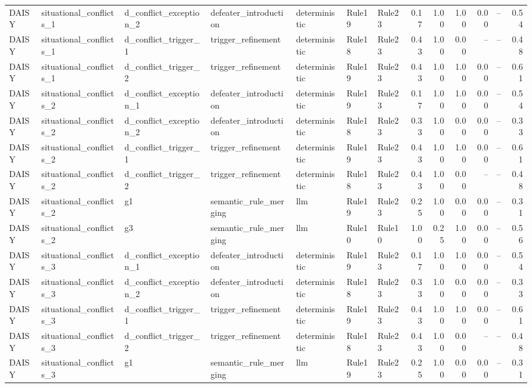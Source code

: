\begin{table}[t]
{\begin{tabular}{lllllllrrrrrr}
DAISY & situational\_conflicts\_1 & d\_conflict\_exception\_2 & defeater\_introduction & deterministic & Rule19 & Rule23 & 0.17 & 1.00 & 1.00 & 0.00 & -- & 0.54 \\
DAISY & situational\_conflicts\_1 & d\_conflict\_trigger\_1 & trigger\_refinement & deterministic & Rule18 & Rule23 & 0.43 & 1.00 & 0.00 & -- & -- & 0.48 \\
DAISY & situational\_conflicts\_1 & d\_conflict\_trigger\_2 & trigger\_refinement & deterministic & Rule19 & Rule23 & 0.43 & 1.00 & 1.00 & 0.00 & -- & 0.61 \\
DAISY & situational\_conflicts\_2 & d\_conflict\_exception\_1 & defeater\_introduction & deterministic & Rule19 & Rule23 & 0.17 & 1.00 & 1.00 & 0.00 & -- & 0.54 \\
DAISY & situational\_conflicts\_2 & d\_conflict\_exception\_2 & defeater\_introduction & deterministic & Rule18 & Rule23 & 0.33 & 1.00 & 0.00 & 0.00 & -- & 0.33 \\
DAISY & situational\_conflicts\_2 & d\_conflict\_trigger\_1 & trigger\_refinement & deterministic & Rule19 & Rule23 & 0.43 & 1.00 & 1.00 & 0.00 & -- & 0.61 \\
DAISY & situational\_conflicts\_2 & d\_conflict\_trigger\_2 & trigger\_refinement & deterministic & Rule18 & Rule23 & 0.43 & 1.00 & 0.00 & -- & -- & 0.48 \\
DAISY & situational\_conflicts\_2 & g1 & semantic\_rule\_merging & llm & Rule19 & Rule23 & 0.25 & 1.00 & 0.00 & 0.00 & -- & 0.31 \\
DAISY & situational\_conflicts\_2 & g3 & semantic\_rule\_merging & llm & Rule10 & Rule10 & 1.00 & 0.25 & 1.00 & 0.00 & -- & 0.56 \\
DAISY & situational\_conflicts\_3 & d\_conflict\_exception\_1 & defeater\_introduction & deterministic & Rule19 & Rule23 & 0.17 & 1.00 & 1.00 & 0.00 & -- & 0.54 \\
DAISY & situational\_conflicts\_3 & d\_conflict\_exception\_2 & defeater\_introduction & deterministic & Rule18 & Rule23 & 0.33 & 1.00 & 0.00 & 0.00 & -- & 0.33 \\
DAISY & situational\_conflicts\_3 & d\_conflict\_trigger\_1 & trigger\_refinement & deterministic & Rule19 & Rule23 & 0.43 & 1.00 & 1.00 & 0.00 & -- & 0.61 \\
DAISY & situational\_conflicts\_3 & d\_conflict\_trigger\_2 & trigger\_refinement & deterministic & Rule18 & Rule23 & 0.43 & 1.00 & 0.00 & -- & -- & 0.48 \\
DAISY & situational\_conflicts\_3 & g1 & semantic\_rule\_merging & llm & Rule19 & Rule23 & 0.25 & 1.00 & 0.00 & 0.00 & -- & 0.31 \\

\end{tabular}}
\end{table}
